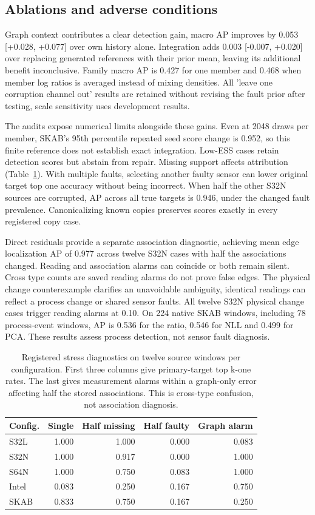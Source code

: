 \documentclass[conference]{IEEEtran}
\newcommand{\1}{\mathbf{1}}
\begin{document}
\subsection{Ablations and adverse conditions}
Graph context contributes a clear detection gain, macro AP improves by 0.053 [+0.028, +0.077] over own history alone. Integration adds 0.003 [-0.007, +0.020] over replacing generated references with their prior mean, leaving its additional benefit inconclusive. Family macro AP is 0.427 for one member and 0.468 when member log ratios is averaged instead of mixing densities. All 'leave one corruption channel out' results are retained without revising the fault prior after testing, scale sensitivity uses development results.

The audits expose numerical limits alongside these gains. Even at 2048 draws per member, SKAB's 95th percentile repeated seed score change is 0.952, so this finite reference does not establish exact integration. Low-ESS cases retain detection scores but abstain from repair. Missing support affects attribution (Table~\ref{tab:stress}). With multiple faults, selecting another faulty sensor can lower original target top one accuracy without being incorrect. When half the other S32N sources are corrupted, AP across all true targets is 0.946, under the changed fault prevalence. Canonicalizing known copies preserves scores exactly in every registered copy case.

Direct residuals provide a separate association diagnostic, achieving mean edge localization AP of 0.977 across twelve S32N cases with half the associations changed. Reading and association alarms can coincide or both remain silent. Cross type counts are saved reading alarms do not prove false edges. The physical change counterexample clarifies an unavoidable ambiguity, identical readings can reflect a process change or shared sensor faults. All twelve S32N physical change cases trigger reading alarms at 0.10. On 224 native SKAB windows, including 78 process-event windows, AP is 0.536 for the ratio, 0.546 for NLL and 0.499 for PCA. These results assess process detection, not sensor fault diagnosis.

\begin{table}[t]
\centering
\caption{Registered stress diagnostics on twelve source windows per configuration. First three columns give primary-target top k-one rates. The last gives measurement alarms within a graph-only error affecting half the stored associations. This is cross-type confusion, not association diagnosis.}
\label{tab:stress}
\small
\begin{tabular}{lrrrr}
\toprule
Config. & Single & Half missing & Half faulty & Graph alarm \\
\midrule
S32L & 1.000 & 1.000 & 0.000 & 0.083 \\
S32N & 1.000 & 0.917 & 0.000 & 1.000 \\
S64N & 1.000 & 0.750 & 0.083 & 1.000 \\
Intel & 0.083 & 0.250 & 0.167 & 0.750 \\
SKAB & 0.833 & 0.750 & 0.167 & 0.250 \\
\bottomrule
\end{tabular}
\end{table}
\end{document}
